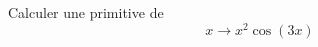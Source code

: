 Calculer une primitive de 
\begin{displaymath}
 x \rightarrow x^2\cos(3x)
\end{displaymath}
\bigskip \bigskip